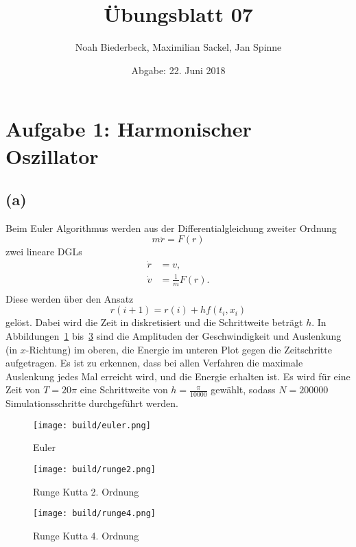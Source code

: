 \documentclass{scrartcl}
\title{Übungsblatt 07}
\author{%
  Noah Biederbeck, Maximilian Sackel, Jan Spinne
}
\date{Abgabe: 22. Juni 2018}
\begin{document}
\maketitle
\section*{Aufgabe 1: Harmonischer Oszillator}
\subsection*{(a)}
Beim Euler Algorithmus werden aus der Differentialgleichung zweiter Ordnung
\begin{equation}
  m \ddot{r} = F(r)
\end{equation}
zwei lineare DGLs
\begin{eqnarray}
  \dot{r} &= v,  \\
  \dot{v} &= \frac{1}{m} F(r). \\
\end{eqnarray}
Diese werden über den Ansatz
\begin{equation}
  r(i+1) = r(i) + h f(t_i, x_i)
\end{equation}
gelöst. Dabei wird die Zeit in diskretisiert und die Schrittweite
beträgt $h$.
In Abbildungen~\ref{fig:euler} bis~\ref{fig:rk4}
sind die Amplituden der Geschwindigkeit und Auslenkung (in $x$-Richtung) im oberen, die Energie im unteren Plot gegen die Zeitschritte aufgetragen.
Es ist zu erkennen, dass bei allen Verfahren die maximale Auslenkung jedes Mal erreicht wird, und
die Energie erhalten ist.
Es wird für eine Zeit von $T = 20\pi$ eine Schrittweite von $h = \frac{\pi}{10000}$ gewählt,
sodass $N = 200000$ Simulationsschritte durchgeführt werden.
\begin{figure}[ht]
  \centering
  \texttt{[image: build/euler.png]}
  \caption{Euler}%
  \label{fig:euler}
\end{figure}
\begin{figure}[ht]
  \centering
  \texttt{[image: build/runge2.png]}
  \caption{Runge Kutta 2. Ordnung}%
  \label{fig:rk2}
\end{figure}
\begin{figure}[ht]
  \centering
  \texttt{[image: build/runge4.png]}
  \caption{Runge Kutta 4. Ordnung}%
  \label{fig:rk4}
\end{figure}
\end{document}
